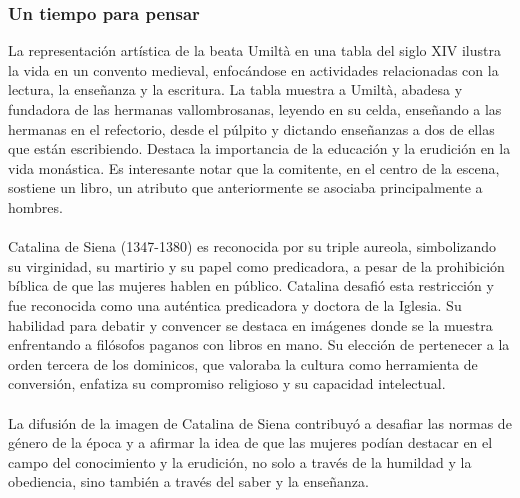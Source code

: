 \documentclass{report}
\begin{document}
\subsubsection{Un tiempo para pensar}
La representación artística de la beata Umiltà en una tabla del siglo XIV ilustra la vida en un convento medieval, enfocándose en actividades relacionadas con la lectura, la enseñanza y la escritura. La tabla muestra a Umiltà, abadesa y fundadora de las hermanas vallombrosanas, leyendo en su celda, enseñando a las hermanas en el refectorio, desde el púlpito y dictando enseñanzas a dos de ellas que están escribiendo. Destaca la importancia de la educación y la erudición en la vida monástica. Es interesante notar que la comitente, en el centro de la escena, sostiene un libro, un atributo que anteriormente se asociaba principalmente a hombres.
\\\\
Catalina de Siena (1347-1380) es reconocida por su triple aureola, simbolizando su virginidad, su martirio y su papel como predicadora, a pesar de la prohibición bíblica de que las mujeres hablen en público. Catalina desafió esta restricción y fue reconocida como una auténtica predicadora y doctora de la Iglesia. Su habilidad para debatir y convencer se destaca en imágenes donde se la muestra enfrentando a filósofos paganos con libros en mano. Su elección de pertenecer a la orden tercera de los dominicos, que valoraba la cultura como herramienta de conversión, enfatiza su compromiso religioso y su capacidad intelectual.
\\\\
La difusión de la imagen de Catalina de Siena contribuyó a desafiar las normas de género de la época y a afirmar la idea de que las mujeres podían destacar en el campo del conocimiento y la erudición, no solo a través de la humildad y la obediencia, sino también a través del saber y la enseñanza.
\end{document}

